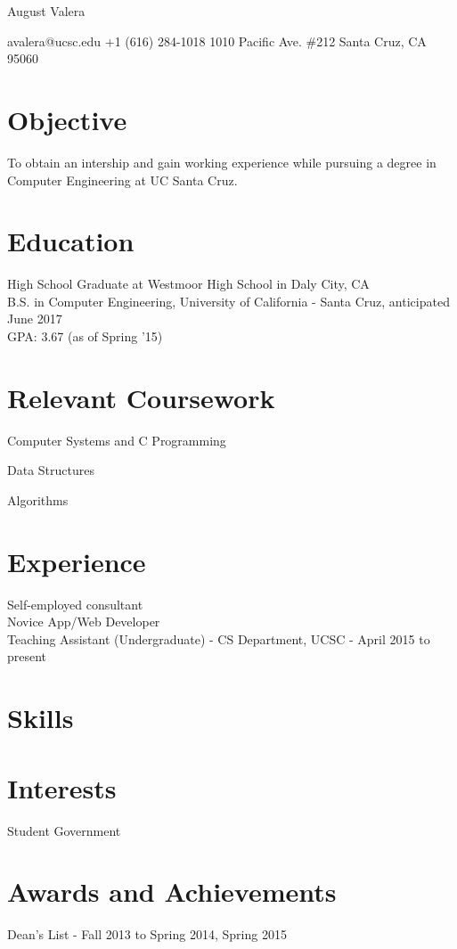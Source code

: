 \documentclass[11pt]{article}
\begin{document}
\centerline{
  \LARGE
  August Valera
}
\centerline{
  avalera@ucsc.edu \textbullet \hspace{1pt} 
  +1 (616) 284-1018 \textbullet \hspace{1pt}
  1010 Pacific Ave. \#212 \textbullet \hspace{1pt}
  Santa Cruz, CA 95060
}
\noindent\hrulefill

\section*{Objective}
To obtain an intership and gain working experience while pursuing a degree in Computer Engineering at UC Santa Cruz.

\section*{Education}
High School Graduate at Westmoor High School in Daly City, CA\\
B.S. in Computer Engineering, University of California - Santa Cruz, anticipated June 2017\\
GPA: 3.67 (as of Spring '15)

\section*{Relevant Coursework}
\begin{description} \itemsep0pt \parskip0pt
  \item[CMPE 13/L] Computer Systems and C Programming
  \item[CMPS 12B/M] Data Structures
  \item[CMPS 101] Algorithms
\end{description}

\section*{Experience}
Self-employed consultant\\
Novice App/Web Developer\\
Teaching Assistant (Undergraduate) - CS Department, UCSC - April 2015 to present

\section*{Skills}

\section*{Interests}
Student Government

\section*{Awards and Achievements}
Dean's List - Fall 2013 to Spring 2014, Spring 2015
\end{document}
